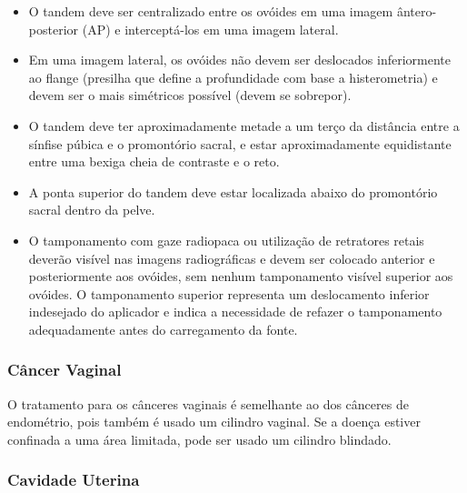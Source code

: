 \documentclass[11pt,a4paper]{article}
\begin{document}
	\begin{itemize}[label=\textcolor{CarnationPink}{$\blacksquare$}]
		\item O tandem deve ser centralizado entre os ovóides em uma imagem ântero-posterior (AP) e interceptá-los em uma imagem lateral.
		\item Em uma imagem lateral, os ovóides não devem ser deslocados inferiormente ao flange (presilha que define a profundidade com base a histerometria) e devem ser o mais simétricos possível (devem se sobrepor).
		\item O tandem deve ter aproximadamente metade a um terço da distância entre a sínfise púbica e o promontório sacral, e estar aproximadamente equidistante entre uma bexiga cheia de contraste e o reto.
		\item A ponta superior do tandem deve estar localizada abaixo do promontório sacral dentro da pelve. 
		\item O tamponamento com gaze radiopaca ou utilização de retratores retais  deverão visível nas imagens radiográficas e devem ser colocado anterior e posteriormente aos ovóides, sem nenhum tamponamento visível superior aos ovóides. O tamponamento superior representa um deslocamento inferior indesejado do aplicador e indica a necessidade de refazer o tamponamento adequadamente antes do carregamento da fonte.
	\end{itemize}
	
\subsubsection*{Câncer Vaginal}

	O tratamento para os cânceres vaginais é semelhante ao dos cânceres de endométrio, pois também é usado um cilindro vaginal. Se a doença estiver confinada a uma área limitada, pode ser usado um cilindro blindado.

\subsubsection*{Cavidade Uterina}
\end{document}
